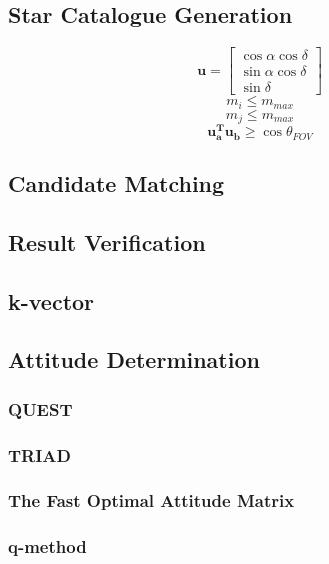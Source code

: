 \documentclass[12pt,a4paper,oneside]{article}
\begin{document}
\subsection{Star Catalogue Generation}
\begin{equation}
\bm{u} = \begin{bmatrix}
\cos \alpha \cos \delta \\
\sin \alpha \cos \delta \\
\sin \delta
\end{bmatrix}
\end{equation}
\begin{equation}
m_i \leq m_{max}
\end{equation}
\begin{equation}
m_j \leq m_{max}
\end{equation}
\begin{equation}
\bm{u_a^T u_b} \geq \cos \theta_{FOV}
\end{equation}

\subsection{Candidate Matching}
\subsection{Result Verification}
\subsection{k-vector}

\subsection{Attitude Determination}
\subsubsection{QUEST}
\subsubsection{TRIAD}
\subsubsection{The Fast Optimal Attitude Matrix}
\subsubsection{q-method}
\end{document}
